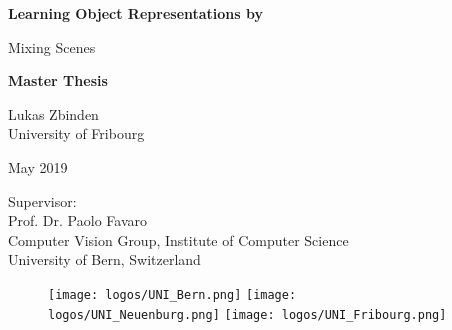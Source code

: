 \documentclass[a4paper,12pt]{report}
\begin{document}
\begin{titlepage}  
  \begin{center}  
  
  \begin{figure}[t]  
  \vspace*{-2cm}        %
  \vspace{0.4in}     
  \end{figure}

    \thispagestyle{empty}
    
    {\bfseries\Huge Learning Object Representations by\par Mixing Scenes\par}

    \vspace{0.3in} 
    \LARGE{\textbf{Master Thesis} \\}
    \vspace{0.4in}

    {\Large Lukas Zbinden \\
    University of Fribourg}
    
    \vspace{0.3in}
    \vfill
    {\Large May 2019 \par}
    
	\vfill
	{\Large
	Supervisor: \\
	Prof. Dr. Paolo Favaro\\
	Computer Vision Group, Institute of Computer Science\\
	University of Bern, Switzerland}
  

  \vspace{0.9in}
 
  \begin{figure}[htp]
    \centering
    \texttt{[image: logos/UNI\_Bern.png]}\hfill
    \texttt{[image: logos/UNI\_Neuenburg.png]}\hfill
    \texttt{[image: logos/UNI\_Fribourg.png]}
  \end{figure}


  \end{center}

\end{titlepage}
\end{document}
